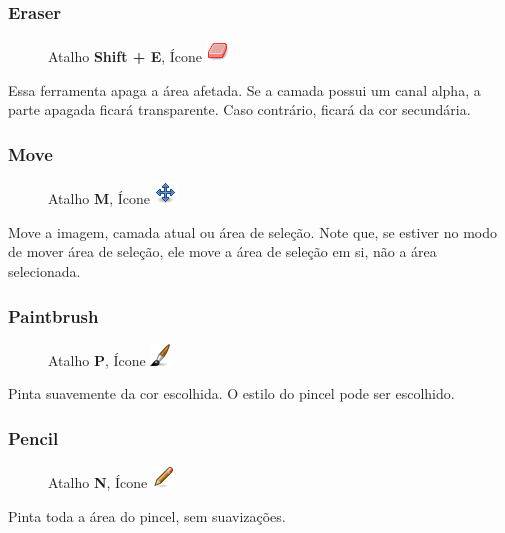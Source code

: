 \documentclass[12pt,onecolumn]{article}
\begin{document}
    \subsubsection{Eraser}
      \begin{figure}[H]
        Atalho {\bf Shift + E}, Ícone
        \includegraphics{gimp-icons/stock-tool-eraser-22.png}
        \label{fig:eraser}
      \end{figure}
      Essa ferramenta apaga a área afetada. Se a camada possui um canal alpha, a parte apagada ficará
      transparente. Caso contrário, ficará da cor secundária.


    \subsubsection{Move}
      \begin{figure}[H]
        Atalho {\bf M}, Ícone
        \includegraphics{gimp-icons/stock-tool-move-22.png}
        \label{fig:move}
      \end{figure}
      Move a imagem, camada atual ou área de seleção. Note que, se estiver no modo de mover área de
      seleção, ele move a área de seleção em si, não a área selecionada.

    \subsubsection{Paintbrush}
      \begin{figure}[H]
        Atalho {\bf P}, Ícone
        \includegraphics{gimp-icons/stock-tool-paintbrush-22.png}
        \label{fig:brush}
      \end{figure}
      Pinta suavemente da cor escolhida. O estilo do pincel pode ser escolhido.
      
    \subsubsection{Pencil}
      \begin{figure}[H]
        Atalho {\bf N}, Ícone
        \includegraphics{gimp-icons/stock-tool-pencil-22.png}
        \label{fig:pencil}
      \end{figure}
      Pinta toda a área do pincel, sem suavizações.
      
\end{document}
